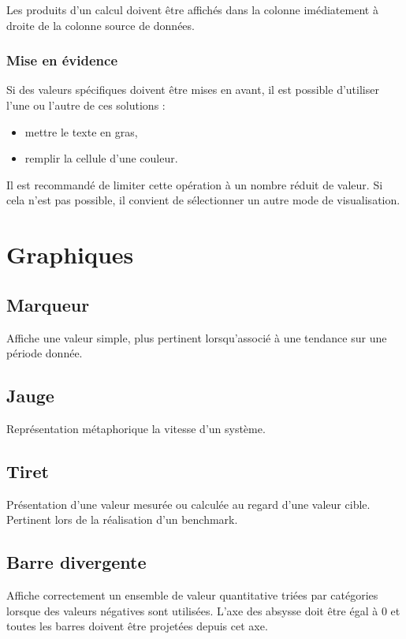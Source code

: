 \documentclass[a4paper,12pt]{article}
\begin{document}
\begin{multicols}{2}
Les produits d'un calcul doivent être affichés dans la colonne imédiatement à droite de la colonne source de données.
\subsubsection*{Mise en évidence}
\label{sec:org1d4a0e3}
Si des valeurs spécifiques doivent être mises en avant, il est possible d'utiliser l'une ou l'autre de ces solutions :
\begin{itemize}
\item mettre le texte en gras,
\item remplir la cellule d'une couleur.
\end{itemize}
Il est recommandé de limiter cette opération à un nombre réduit de valeur. Si cela n'est pas possible, il convient de sélectionner un autre mode de visualisation.
\section*{Graphiques}
\label{sec:org18d6047}
\subsection*{Marqueur}
\label{sec:orgc99be85}
Affiche une valeur simple, plus pertinent lorsqu'associé à une tendance sur une période donnée. \autocite{mikeyiHowChooseRight2020}
\subsection*{Jauge}
\label{sec:org052963e}
Représentation métaphorique la vitesse d'un système.
\subsection*{Tiret}
\label{sec:org3117a68}
Présentation d'une valeur mesurée ou calculée au regard d'une valeur cible. \autocite{alansmithLexiqueVisuel} Pertinent lors de la réalisation d'un benchmark. \autocite{mikeyiHowChooseRight2020}
\subsection*{Barre divergente}
\label{sec:orgbac6ece}
Affiche correctement un ensemble de valeur quantitative triées par catégories lorsque des valeurs négatives sont utilisées. \autocite{alansmithLexiqueVisuel} L'axe des absysse doit être égal à 0 et toutes les barres doivent être projetées depuis cet axe.

\end{multicols}
\end{document}

